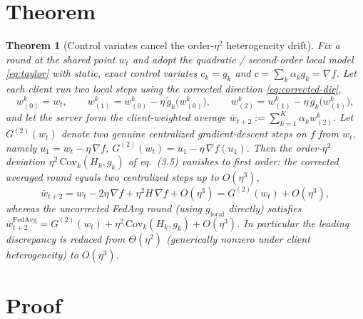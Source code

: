 \documentclass[11pt]{article}
\newtheorem{theorem}{Theorem}
\theoremstyle{definition}
\theoremstyle{remark}
\begin{document}
\section*{Theorem}

\begin{theorem}[Control variates cancel the order-$\eta^2$ heterogeneity drift]
\label{thm:main}
Fix a round at the shared point $w_t$ and adopt the quadratic / second-order local model
\eqref{eq:taylor} with static, exact control variates $c_k=g_k$ and
$c=\sum_k\alpha_k g_k=\nabla f$. Let each client run \emph{two} local steps using the corrected
direction \eqref{eq:corrected-dir},
\[
  w^{k}_{(0)}=w_t,\qquad
  w^{k}_{(1)}=w^{k}_{(0)}-\eta\,\tilde g_k\!\big(w^{k}_{(0)}\big),\qquad
  w^{k}_{(2)}=w^{k}_{(1)}-\eta\,\tilde g_k\!\big(w^{k}_{(1)}\big),
\]
and let the server form the client-weighted average $\bar w_{t+2}:=\sum_{k=1}^{K}\alpha_k
w^{k}_{(2)}$. Let $G^{(2)}(w_t)$ denote two genuine centralized gradient-descent steps on $f$
from $w_t$, namely $u_1=w_t-\eta\,\nabla f$, $G^{(2)}(w_t)=u_1-\eta\,\nabla f(u_1)$. Then the
order-$\eta^2$ deviation $\eta^2\,\mathrm{Cov}_k(H_k,g_k)$ of eq.~(3.5) vanishes to first
order: the corrected averaged round equals two centralized steps up to $O(\eta^3)$,
\[
  \bar w_{t+2}
  = w_t-2\eta\,\nabla f+\eta^2 H\,\nabla f+O(\eta^3)
  = G^{(2)}(w_t)+O(\eta^3),
\]
whereas the \emph{uncorrected} FedAvg round (using $g_{\mathrm{local}}$ directly) satisfies
$\bar w^{\mathrm{FedAvg}}_{t+2}=G^{(2)}(w_t)+\eta^2\,\mathrm{Cov}_k(H_k,g_k)+O(\eta^3)$. In
particular the leading discrepancy is reduced from $\Theta(\eta^2)$ (generically nonzero under
client heterogeneity) to $O(\eta^3)$.
\end{theorem}

\section*{Proof}
\end{document}
